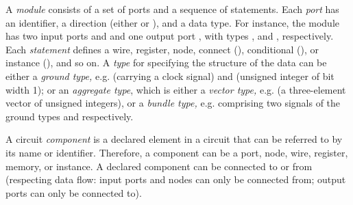 A \emph{module} consists of a set of ports and a sequence of statements.
Each \emph{port} has an identifier, a direction (either  or ), and a data type.
For instance, the module  has two input ports  and  and one output port , with
types ,  and  , respectively.
Each \emph{statement} defines a wire, register, node, connect (\prettyll{<=}), conditional (), or instance (), and so on.
A \emph{type} for specifying the structure of the data can be either a \emph{ground type,} e.g.  (carrying a clock signal) and  (unsigned integer of bit width 1);
or an \emph{aggregate type}, which is either a \emph{vector type,} e.g.  (a three-element vector of unsigned integers),
or a \emph{bundle type,} e.g.  comprising two signals of the ground types  and  respectively.


A circuit \emph{component} is a declared element in a {\firrtl}  circuit that can be referred to by its name or identifier.
Therefore, a component can be a port, node, wire, register, memory, or instance.
A declared component can be connected to or from
(respecting data flow: input ports and nodes can only be connected from; output ports can only be connected to).


